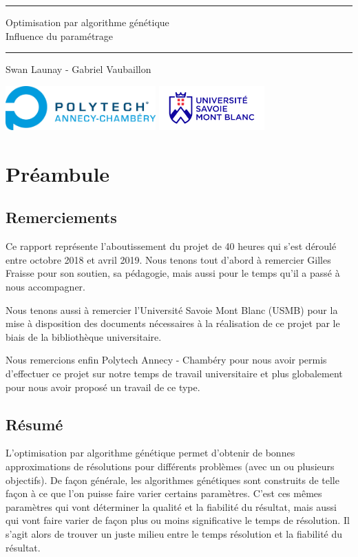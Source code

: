 \documentclass[12pt]{report}
\begin{document}
\geometry{hmargin=2.5cm,vmargin=1.5cm}
  \begin{titlepage}
    \centering
        \vfill
        {\rule{\linewidth}{.5pt}
        \huge
            Optimisation par algorithme génétique\\
          \large
            Influence du paramétrage\\
          \rule{\linewidth}{.5pt}
            \vskip2cm
            Swan Launay - Gabriel Vaubaillon\\
        }
        \vfill
        \includegraphics[height=1.7cm]{logo/polytech.jpg}
        \hfill
        \includegraphics[height=1.7cm]{logo/usmb.png}
  \end{titlepage}
  \chapter{Préambule}
    \section{Remerciements}
      Ce rapport représente l'aboutissement du projet de 40 heures qui s'est déroulé entre octobre 2018 et avril 2019. Nous tenons tout d'abord à remercier Gilles Fraisse pour son soutien, sa pédagogie, mais aussi pour le temps qu'il a passé à nous accompagner.

      Nous tenons aussi à remercier l'Université Savoie Mont Blanc (USMB) pour la mise à disposition des documents nécessaires à la réalisation de ce projet par le biais de la bibliothèque universitaire.

      Nous remercions enfin Polytech Annecy - Chambéry pour nous avoir permis d'effectuer ce projet sur notre temps de travail universitaire et plus globalement pour nous avoir proposé un travail de ce type.

    \section{Résumé}
      L'optimisation par algorithme génétique permet d'obtenir de bonnes approximations de résolutions pour différents problèmes (avec un ou plusieurs objectifs). De façon générale, les algorithmes génétiques sont construits de telle façon à ce que l'on puisse faire varier certains paramètres. C'est ces mêmes paramètres qui vont déterminer la qualité et la fiabilité du résultat, mais aussi qui vont faire varier de façon plus ou moins significative le temps de résolution. Il s'agit alors de trouver un juste milieu entre le temps résolution et la fiabilité du résultat.
\end{document}
